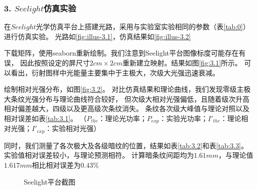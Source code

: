 \documentclass[12pt,a4paper,UTF8]{ctexart}
\begin{document}
\subsubsection*{3. $Seelight$仿真实验}
在$Seelight$光学仿真平台上搭建光路，采用与实验室实验相同的参数（表\ref{tab:0}）进行仿真实验。
光路如\ref{fig:illus-3.1}，仿真结果如\ref{fig:illus-3.2}

下载矩阵，使用seaborn重新绘制。我们注意到Seelight平台图像标度可能存在有误，
因此按照设定的屏尺寸$2cm \times 2cm$重新建立映射。结果如图\ref{fig:3.1}所示。
可以看出，衍射图样中光能量主要集中于主极大，次级大光强迅速衰减。

绘制相对光强分布，如图\ref{fig:3.2}。
对比仿真结果和理论曲线，我们发现零级主极大条纹光强分布与理论曲线符合较好，
但次级大相对光强偏低，且随着级次升高相对偏差越大，四级以及更高级次条纹消失。
条纹各次级大峰值与理论对照以及相对误差如表\ref{tab:3.1}。
（$P_{the}$：理论光功率；$P_{exp}$：实验光功率；$I'_{the}$：理论相对光强；$I'_{exp}$：实验相对光强）

同时，我们测量了各次极大及各级暗纹的位置，结果如表\ref{tab:3.2}和表\ref{tab:3.3}。
实验值相对误差较小，与理论预测相符。
计算暗条纹间距均为$1.61mm$，与理论值$1.617mm$相比相对误差为$0.43\%$

\begin{figure}[htbp]
	\centering
	\caption{Seelight平台截图}
\end{figure}
\end{document}
